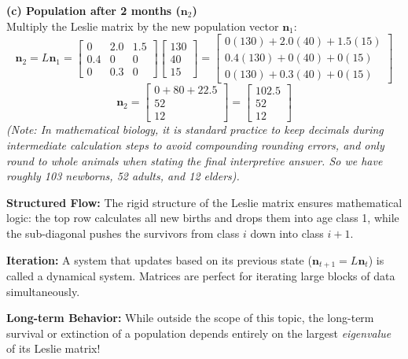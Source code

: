 \begin{solution}
\medskip
\textbf{(c) Population after 2 months ($\mathbf{n}_2$)} \\
Multiply the Leslie matrix by the new population vector $\mathbf{n}_1$:
\[
\mathbf{n}_2 = L \mathbf{n}_1 = 
\begin{bmatrix} 0 & 2.0 & 1.5 \\ 0.4 & 0 & 0 \\ 0 & 0.3 & 0 \end{bmatrix}
\begin{bmatrix} 130 \\ 40 \\ 15 \end{bmatrix}
= 
\begin{bmatrix} 
0(130) + 2.0(40) + 1.5(15) \\ 
0.4(130) + 0(40) + 0(15) \\ 
0(130) + 0.3(40) + 0(15) 
\end{bmatrix}
\]
\[
\mathbf{n}_2 = \begin{bmatrix} 0 + 80 + 22.5 \\ 52 \\ 12 \end{bmatrix} = \begin{bmatrix} 102.5 \\ 52 \\ 12 \end{bmatrix}
\]
\emph{(Note: In mathematical biology, it is standard practice to keep decimals during intermediate calculation steps to avoid compounding rounding errors, and only round to whole animals when stating the final interpretive answer. So we have roughly 103 newborns, 52 adults, and 12 elders).}
\end{solution}

\begin{takeaways}
\item \textbf{Structured Flow:} The rigid structure of the Leslie matrix ensures mathematical logic: the top row calculates all new births and drops them into age class 1, while the sub-diagonal pushes the survivors from class $i$ down into class $i+1$.
\item \textbf{Iteration:} A system that updates based on its previous state ($\mathbf{n}_{t+1} = L \mathbf{n}_t$) is called a dynamical system. Matrices are perfect for iterating large blocks of data simultaneously.
\item \textbf{Long-term Behavior:} While outside the scope of this topic, the long-term survival or extinction of a population depends entirely on the largest \emph{eigenvalue} of its Leslie matrix!
\end{takeaways}
